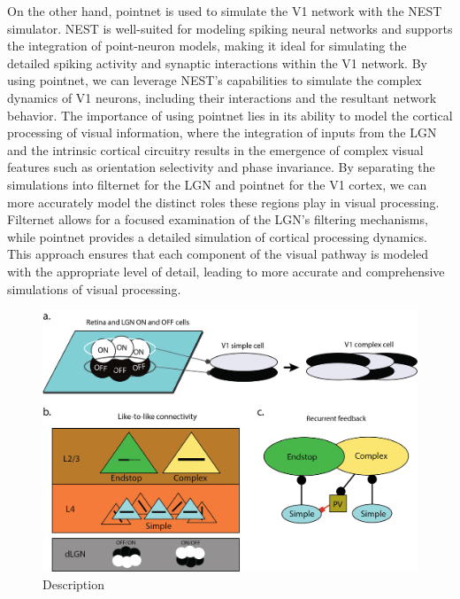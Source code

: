 \documentclass[12pt]{article}
\begin{document}
\noindent On the other hand, pointnet is used to simulate the V1 network with the NEST simulator. NEST is well-suited for modeling spiking neural networks and supports the integration of point-neuron models, making it ideal for simulating the detailed spiking activity and synaptic interactions within the V1 network. By using pointnet, we can leverage NEST's capabilities to simulate the complex dynamics of V1 neurons, including their interactions and the resultant network behavior. The importance of using pointnet lies in its ability to model the cortical processing of visual information, where the integration of inputs from the LGN and the intrinsic cortical circuitry results in the emergence of complex visual features such as orientation selectivity and phase invariance. By separating the simulations into filternet for the LGN and pointnet for the V1 cortex, we can more accurately model the distinct roles these regions play in visual processing. Filternet allows for a focused examination of the LGN's filtering mechanisms, while pointnet provides a detailed simulation of cortical processing dynamics. This approach ensures that each component of the visual pathway is modeled with the appropriate level of detail, leading to more accurate and comprehensive simulations of visual processing.

\begin{figure}[H]
  \centering
  \includegraphics[width=1.0 \textwidth]{figures/LIF_Overview_Receptive_Field_Methods.png}
  \caption{Description}
  \label{fig:LIF_Overview}
\end{figure}
\end{document}

